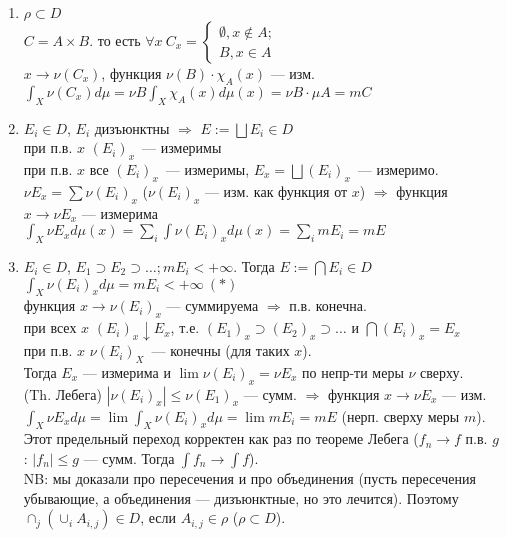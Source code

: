 \documentclass[paper=a4, fontsize=17pt]{article}
\begin{document}
		\begin{enumerate}
			\item
				$\rho \subset D$\\
				$C = A \times B$. то есть $\forall x\ C_x = 
                    \begin{cases}
                        \emptyset, x \not\in A;\\
                        B, x \in A
                    \end{cases}$\\
				$x \rightarrow \nu(C_x)$, функция $\nu(B) \cdot \chi_A(x)$ --- изм.\\
				$\int_X \nu(C_x)d\mu = \nu B \int_X \chi_A(x)d\mu(x) = \nu B \cdot \mu A = m C$
			\item
				$E_i \in D$, $E_i$ дизъюнктны $\Rightarrow$ $E := \bigsqcup E_i \in D$\\
				при п.в. $x$ $(E_i)_x$~--- измеримы\\
				при п.в. $x$ все $(E_i)_x$~--- измеримы, $E_x = \bigsqcup (E_i)_x$~--- измеримо.\\
				$\nu E_x = \sum \nu (E_i)_x$ ($\nu (E_i)_x$ --- изм. как функция от $x$) $\Rightarrow$ функция $ x \rightarrow \nu E_x$ --- измерима\\
				$\int_X \nu E_x d\mu(x) = \sum_{i}\int\nu(E_i)_x d\mu(x) = \sum_{i}m E_i = m E$
			\item
				$E_i \in D$, $E_1 \supset E_2 \supset \ldots ; m E_i < +\infty$. Тогда $E := \bigcap E_i \in D$\\
				$\int_X\nu(E_i)_x d\mu = m E_i < +\infty\ (*)$\\
				функция $x \rightarrow \nu(E_i)_x$ --- суммируема $\Rightarrow$ п.в. конечна.\\
				при всех $x$ $(E_i)_x \downarrow E_x$, т.е. $(E_1)_x \supset (E_2)_x \supset \ldots $ и $\bigcap(E_i)_x = E_x$\\
				при п.в. $x$ $\nu(E_i)_X$~--- конечны (для таких $x$).\\
				Тогда $E_x$ --- измерима и $\lim \nu(E_i)_x = \nu E_x$ по непр-ти меры $\nu$ сверху.\\
				(Th. Лебега) $|\nu(E_i)_x| \leq \nu(E_1)_x$ --- сумм. $\Rightarrow$ функция $x \rightarrow \nu E_x$ --- изм.\\
				$\int_X\nu E_x d\mu = \lim\int_X\nu(E_i)_x d\mu = \lim m E_i = m E$ (нерп. сверху меры $m$). Этот предельный переход корректен как раз по теореме Лебега ($f_n \rightarrow f$ п.в. $g$ : $|f_n| \leq g$ --- сумм. Тогда $\int f_n \rightarrow \int f$).\\
				NB: мы доказали про пересечения и про объединения (пусть пересечения убывающие, а объединения --- дизъюнктные, но это лечится). Поэтому $\cap_j(\cup_i A_{i, j}) \in D$, если $A_{i,j} \in \rho$ ($\rho \subset D$).
				

\end{enumerate}
\end{document}

